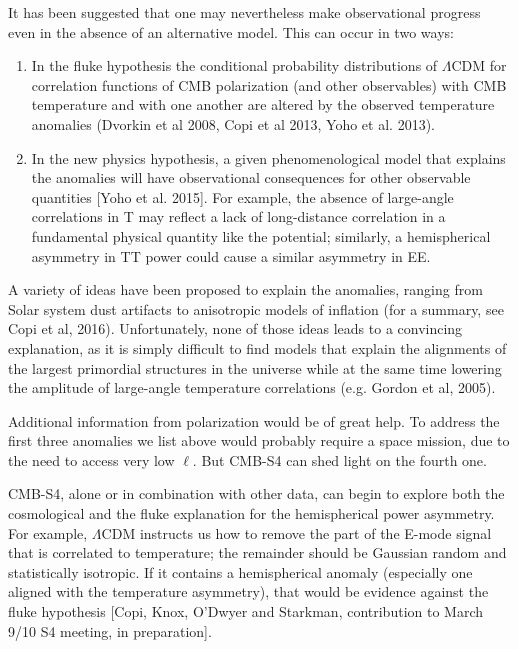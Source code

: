 It has been suggested that one may nevertheless make observational progress even in the absence of an alternative model.  This can occur in two ways:
\begin{enumerate}
  \item In the fluke hypothesis the conditional probability distributions of $\Lambda$CDM for correlation functions of CMB polarization
  (and other observables) with CMB temperature and with one another are altered by the observed temperature anomalies  
  (Dvorkin et al 2008, Copi et al 2013, Yoho et al. 2013). 
  \item In the new physics hypothesis, a given phenomenological model that explains the anomalies will have observational consequences
  for other observable quantities [Yoho et al. 2015]. For example, the absence of large-angle correlations in T may reflect a lack of
  long-distance correlation in a fundamental physical quantity like the potential; similarly, 
  a hemispherical asymmetry in TT power could cause a similar asymmetry in EE.
\end{enumerate}

A variety of ideas have been proposed to explain the anomalies, ranging from Solar system dust artifacts to anisotropic models of inflation (for a summary, see Copi et al, 2016). Unfortunately, none of those ideas leads to a convincing explanation, as it is simply difficult to find models that explain the alignments of the largest primordial structures in the universe while at the same time lowering the amplitude of large-angle temperature correlations (e.g. Gordon et al, 2005). 

Additional information from polarization would be of great help. To address the first three anomalies we list above would probably require a space mission, due to the need to access very low $\ell$. But CMB-S4 can shed light on the fourth one. 

CMB-S4, alone or in combination with other data, can begin to explore both the cosmological and the fluke explanation for the hemispherical power asymmetry.  For example, $\Lambda$CDM instructs us how to remove the part of the E-mode signal that is correlated to temperature; the remainder should be Gaussian random and statistically isotropic.  If it contains a hemispherical anomaly (especially one aligned with the temperature asymmetry), that would be evidence against the fluke hypothesis [Copi, Knox, O’Dwyer and Starkman, contribution to March 9/10 S4 meeting, in preparation]. 

